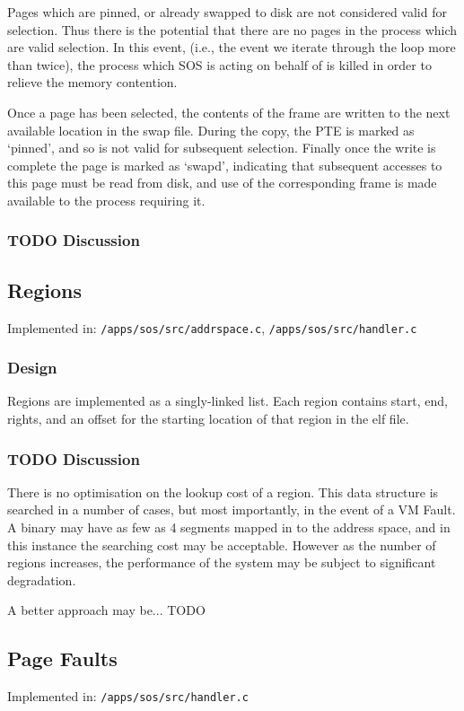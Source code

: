 \documentclass[a4paper,12pt]{article}
\begin{document}
Pages which are pinned, or already swapped to disk are not considered valid
for selection.  Thus there is the potential that there are no pages in the
process which are valid selection.  In this event, (i.e., the event we iterate
through the loop more than twice), the process which SOS is acting on behalf
of is killed in order to relieve the memory contention.

Once a page has been selected, the contents of the frame are written to the
next available location in the swap file.  During the copy, the PTE is marked
as `pinned', and so is not valid for subsequent selection.  Finally once the
write is complete the page is marked as `swapd', indicating that subsequent
accesses to this page must be read from disk, and use of the corresponding
frame is made available to the process requiring it.

\subsubsection{TODO Discussion}

\subsection{Regions}
Implemented in: \texttt{/apps/sos/src/addrspace.c}, \texttt{/apps/sos/src/handler.c}

\subsubsection{Design}
Regions are implemented as a singly-linked list.  Each region contains start,
end, rights, and an offset for the starting location of that region in the elf
file.

\subsubsection{TODO Discussion}
There is no optimisation on the lookup cost of a region.  This data structure
is searched in a number of cases, but most importantly, in the event of a VM
Fault.  A binary may have as few as 4 segments mapped in to the address space,
and in this instance the searching cost may be acceptable.  However as the
number of regions increases, the performance of the system may be subject to
significant degradation.

A better approach may be... TODO

\subsection{Page Faults}
Implemented in: \texttt{/apps/sos/src/handler.c}
\end{document}
